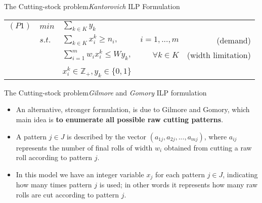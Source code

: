 \documentclass[10pt]{beamer}
\begin{document}
\begin{frame}{The Cutting-stock problem}{\textit{Kantorovich} ILP Formulation }


\begin{tabular}{lllrr}

$(P1)$ & $min$ & $\displaystyle\sum_{k \in K} y_k$ && \\
&$s.t.$ & $\displaystyle\sum_{k \in K} x_i^k \geq n_i,$ & $i = 1,...,m$ & (demand) \\
&& $\displaystyle\sum_{i = 1}^m w_i x_i^k \leq W y_k,$ & $\forall k \in K$ & (width limitation) \\\\
&& $x_i^k \in \mathbb{Z}_{+}, y_k \in \lbrace 0, 1 \rbrace$ &&
\end{tabular}

\end{frame}

\begin{frame}{The Cutting-stock problem}{\textit{Gilmore} and \textit{Gomory} ILP formulation}

\begin{itemize}
\item An alternative, stronger formulation, is due to Gilmore and Gomory, which main idea is \textbf{to enumerate all possible raw cutting patterns}. 

\item A pattern $j \in J$ is described by the vector $(a_{1j},a_{2j},...,a_{mj})$, where $a_{ij}$ represents the number of final rolls of width $w_i$ obtained from cutting a raw roll according to pattern $j$. 

\item In this model we have an integer variable $x_j$ for each pattern $j \in J$, indicating how many times pattern $j$ is used; in other words it represents how many raw rolls are cut according to pattern $j$. 
\end{itemize}


\end{frame}
\end{document}
